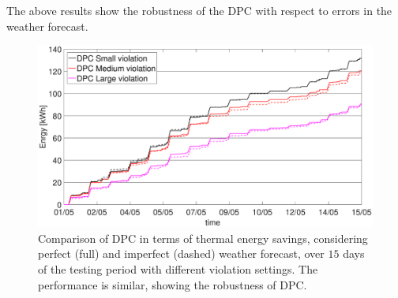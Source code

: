 \textcolor[rgb]{0,0,1}{The above results show the robustness of the DPC with respect to errors in the weather forecast.}
\begin{figure}[t!]
	\begin{center}
		\includegraphics[width=28pc]{figures/Energy_all_EnergyPlus_noisy.eps}
	\end{center}
	\caption{\textcolor[rgb]{0,0,1}{Comparison of DPC in terms of thermal energy savings, considering perfect (full) and imperfect (dashed) weather forecast, over $15$ days of the testing period with different violation settings. The performance is similar, showing the robustness of DPC.}}
	\label{F:comparison_all_energy_E+_noisy}
\end{figure}

